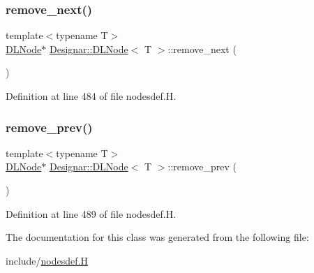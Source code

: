 \subsubsection{\texorpdfstring{remove\+\_\+next()}{remove\_next()}}
{\footnotesize\ttfamily template$<$typename T$>$ \\
\hyperlink{class_designar_1_1_d_l_node}{D\+L\+Node}$\ast$ \hyperlink{class_designar_1_1_d_l_node}{Designar\+::\+D\+L\+Node}$<$ T $>$\+::remove\+\_\+next (\begin{DoxyParamCaption}{ }\end{DoxyParamCaption})\hspace{0.3cm}{\ttfamily [inline]}}



Definition at line 484 of file nodesdef.\+H.

\mbox{\label{class_designar_1_1_d_l_node_a0bd2bf491ab61ab3fd1eb6b8b06dcae5}} 
\subsubsection{\texorpdfstring{remove\+\_\+prev()}{remove\_prev()}}
{\footnotesize\ttfamily template$<$typename T$>$ \\
\hyperlink{class_designar_1_1_d_l_node}{D\+L\+Node}$\ast$ \hyperlink{class_designar_1_1_d_l_node}{Designar\+::\+D\+L\+Node}$<$ T $>$\+::remove\+\_\+prev (\begin{DoxyParamCaption}{ }\end{DoxyParamCaption})\hspace{0.3cm}{\ttfamily [inline]}}



Definition at line 489 of file nodesdef.\+H.



The documentation for this class was generated from the following file\+:\begin{DoxyCompactItemize}
\item 
include/\hyperlink{nodesdef_8_h}{nodesdef.\+H}\end{DoxyCompactItemize}
